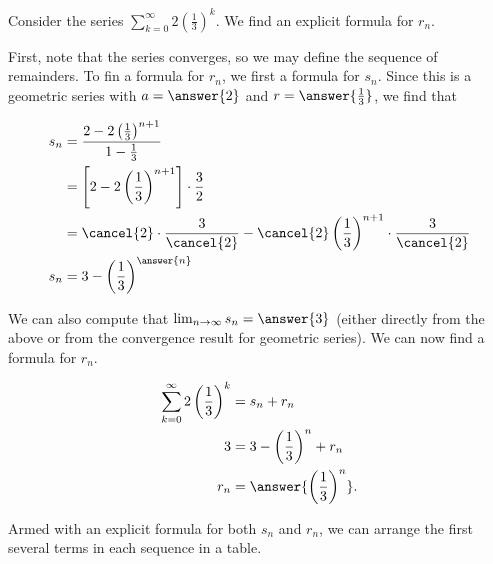 \documentclass{ximera}
\begin{document}
\begin{example}
Consider the series $\sum_{k=0}^{\infty} 2\left(\frac{1}{3}\right)^k$.  We find an explicit formula for $r_n$.

\begin{explanation}
First, note that the series converges, so we may define the sequence of remainders.  To fin a formula for $r_n$, we first a formula for $s_n$.  Since this is a geometric series with $a= \answer{2}$ and $r = \answer{\frac{1}{3}}$, we find that 

\begin{align*}
s_n &= \frac{2-2\left(\frac{1}{3}\right)^{n+1}}{1-\frac{1}{3}} \\
&= \left[2-2\left(\frac{1}{3}\right)^{n+1}\right] \cdot \frac{3}{2} \\
&= \cancel{2} \cdot \frac{3}{\cancel{2}}- \cancel{2}\left(\frac{1}{3}\right)^{n+1} \cdot \frac{3}{\cancel{2}}\\
s_n &= 3-\left(\frac{1}{3}\right)^{\answer{n}}
\end{align*}

We can also compute that $\lim_{n \to \infty} s_n = \answer{3}$ (either directly from the above or from the convergence result for geometric series).  We can now find a formula for $r_n$.

\begin{align*}
\sum_{k=0}^{\infty} 2\left(\frac{1}{3}\right)^k &= s_n + r_n \\
3 &= 3-\left(\frac{1}{3}\right)^{n} + r_n \\
r_n &=\answer{\left(\frac{1}{3}\right)^{n}} . \\
\end{align*}

\end{explanation}
\end{example}

Armed with an explicit formula for both $s_n$ and $r_n$, we can arrange the first several terms in each sequence in a table.
\end{document}
